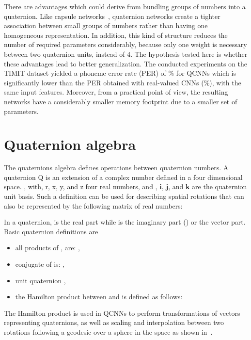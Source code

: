 \documentclass[a4paper]{article}
\def\i{\textbf{i}}
\def\j{\textbf{j}}
\begin{document}
There are advantages which could derive from bundling groups of numbers into a quaternion. Like capsule networks~\cite{hinton2017capsule}, quaternion networks create a tighter association between small groups of numbers rather than having one homogeneous representation. In addition, this kind of structure reduces the number of required parameters considerably, because only one weight is necessary between two quaternion units, instead of 4. The hypothesis tested here is whether these advantages lead to better generalization.
The conducted experiments on the TIMIT dataset yielded a phoneme error rate (PER) of \% for QCNNs which is significantly lower than the PER obtained with real-valued CNNs (\%), with the same input features. Moreover, from a practical point of view, the resulting networks have a considerably smaller memory footprint due to a smaller set of parameters.

 



\section{Quaternion algebra}
\label{sec:qalgebra}
The quaternions algebra  defines operations between quaternion numbers. A quaternion Q is  an extension of a complex number defined in a four dimensional space. , with, r, x, y, and z four real numbers, and , \i, \j, and \textbf{k} are the quaternion unit basis. Such a definition can be used for describing spatial rotations that can also be represented by the following matrix of real numbers:

In a quaternion,  is the real part while  is the imaginary part () or the vector part.
Basic quaternion definitions are
\begin{itemize}
\renewcommand{\labelitemi}{}
\item all products of , are: ,
\item conjugate  of  is: ,
\label{eq:conjugate}
\item unit quaternion ,
\label{eq:normalized}
\label{eq:norm}
\item the Hamilton product  between  and  is defined as follows: 

\end{itemize}
The Hamilton product is used in QCNNs to perform transformations of vectors representing quaternions, as well as scaling and interpolation between two rotations following a geodesic over a sphere in the  space as shown in~\cite{minemoto2017feed}.
\end{document}
